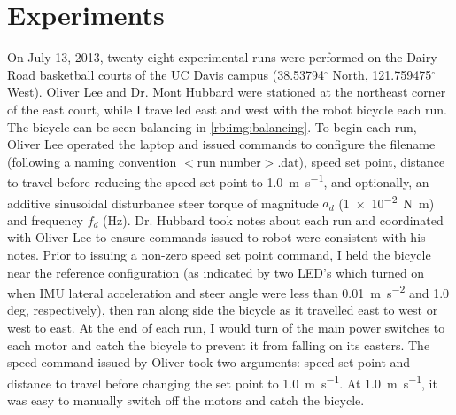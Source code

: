 \section{Experiments} \label{rb:sec:experiments}

On July 13, 2013, twenty eight experimental runs were performed on the Dairy
Road basketball courts of the UC Davis campus (38.53794$^{\circ}$ North,
121.759475$^{\circ}$ West). Oliver Lee and Dr. Mont Hubbard were stationed at
the northeast corner of the east court, while I travelled east and west with
the robot bicycle each run. The bicycle can be seen balancing in
\autoref{rb:img:balancing}. To begin each run, Oliver Lee operated the laptop
and issued commands to configure the filename (following a naming convention
$<$run number$>$.dat), speed set point, distance to travel before reducing the
speed set point to \SI{1.0}{\m\per\s}, and optionally, an additive sinusoidal
disturbance steer torque of magnitude $a_d$ (\SI{1e-2}{\N\m}) and frequency
$f_d$ (\si{\Hz}). Dr. Hubbard took notes about each run and coordinated with
Oliver Lee to ensure commands issued to robot were consistent with his notes.
Prior to issuing a non-zero speed set point command, I held the bicycle near
the reference configuration (as indicated by two LED's which turned on when IMU
lateral acceleration and steer angle were less than \SI{0.01}{\m\per\s\squared}
and 1.0 deg, respectively), then ran along side the bicycle as it travelled
east to west or west to east. At the end of each run, I would turn of the main
power switches to each motor and catch the bicycle to prevent it from falling
on its casters.  The speed command issued by Oliver took two arguments: speed
set point and distance to travel before changing the set point to
\SI{1.0}{\m\per\s}. At \SI{1.0}{\m\per\s}, it was easy to manually switch off
the motors and catch the bicycle.

